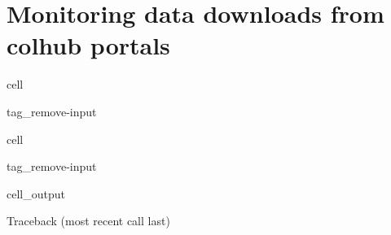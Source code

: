 \documentclass[letterpaper,10pt,english]{jupyterBook}
\begin{document}
\chapter{Monitoring data downloads from colhub portals}
\label{\detokenize{user_downloads:monitoring-data-downloads-from-colhub-portals}}\label{\detokenize{user_downloads::doc}}
\begin{sphinxuseclass}{cell}
\begin{sphinxuseclass}{tag_remove-input}
\end{sphinxuseclass}
\end{sphinxuseclass}
\begin{sphinxuseclass}{cell}
\begin{sphinxuseclass}{tag_remove-input}\begin{sphinxVerbatimOutput}

\begin{sphinxuseclass}{cell_output}
\begin{sphinxVerbatim}[commandchars=\\\{\}]
Traceback (most recent call last)
 \PYG{p}{[}\PYG{p}{]}  
 
  
  
  


\end{sphinxVerbatim}
\end{sphinxuseclass}
\end{sphinxVerbatimOutput}
\end{sphinxuseclass}
\end{sphinxuseclass}
\end{document}
